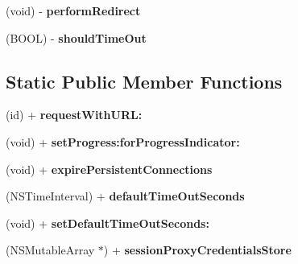 \begin{DoxyCompactItemize}
\item 
\hypertarget{interface_a_s_i_h_t_t_p_request_a2862f6f1db8f1146e96470f926561b93}{
(void) -\/ {\bfseries performRedirect}}
\label{interface_a_s_i_h_t_t_p_request_a2862f6f1db8f1146e96470f926561b93}

\item 
\hypertarget{interface_a_s_i_h_t_t_p_request_acedb1516f19af14df7b44602b700bae3}{
(BOOL) -\/ {\bfseries shouldTimeOut}}
\label{interface_a_s_i_h_t_t_p_request_acedb1516f19af14df7b44602b700bae3}

\end{DoxyCompactItemize}
\subsection*{Static Public Member Functions}
\begin{DoxyCompactItemize}
\item 
\hypertarget{interface_a_s_i_h_t_t_p_request_a7765ce1ee8f72ed8c94cdf8496ad402f}{
(id) + {\bfseries requestWithURL:}}
\label{interface_a_s_i_h_t_t_p_request_a7765ce1ee8f72ed8c94cdf8496ad402f}

\item 
\hypertarget{interface_a_s_i_h_t_t_p_request_aa832764dd51b0bfd741d1beebd768d40}{
(void) + {\bfseries setProgress:forProgressIndicator:}}
\label{interface_a_s_i_h_t_t_p_request_aa832764dd51b0bfd741d1beebd768d40}

\item 
\hypertarget{interface_a_s_i_h_t_t_p_request_ac9af022d65aa15048ef764a25eda64be}{
(void) + {\bfseries expirePersistentConnections}}
\label{interface_a_s_i_h_t_t_p_request_ac9af022d65aa15048ef764a25eda64be}

\item 
\hypertarget{interface_a_s_i_h_t_t_p_request_a366919ebbfefeb30a42e057514a9a357}{
(NSTimeInterval) + {\bfseries defaultTimeOutSeconds}}
\label{interface_a_s_i_h_t_t_p_request_a366919ebbfefeb30a42e057514a9a357}

\item 
\hypertarget{interface_a_s_i_h_t_t_p_request_a0137fc16c7556f93a0278fa24ea5e85e}{
(void) + {\bfseries setDefaultTimeOutSeconds:}}
\label{interface_a_s_i_h_t_t_p_request_a0137fc16c7556f93a0278fa24ea5e85e}

\item 
\hypertarget{interface_a_s_i_h_t_t_p_request_a6afdbd6d28c19e6a7f9ef6d0cf8b746a}{
(NSMutableArray $\ast$) + {\bfseries sessionProxyCredentialsStore}}
\label{interface_a_s_i_h_t_t_p_request_a6afdbd6d28c19e6a7f9ef6d0cf8b746a}


\end{DoxyCompactItemize}
